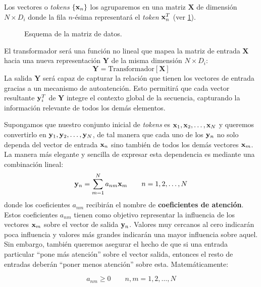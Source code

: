 Los vectores o \textit{tokens} $\{\mathbf{x}_n\}$ los agruparemos en una matriz $\mathbf{X}$ de dimensión $N \times D_i$ donde la fila $n$-ésima representará el  \textit{token} ${\mathbf{x}_n ^{T}}$ (ver \ref{fig:matriz_X}).

\begin{figure}[t]
    \vspace{0.8cm}
    \centering
    \MatrizX
    \caption{Esquema de la matriz de datos.}
    \label{fig:matriz_X}
    \vspace{0.8cm}
\end{figure}
El transformador será una función no lineal que mapea la matriz de 
entrada $\mathbf{X}$ hacia una nueva representación $\mathbf{Y}$ de la
misma dimensión $N \times D_i$:
\begin{equation}
    \mathbf{Y} = \text{Transformador}[\mathbf{X}]
\end{equation}
La salida $\mathbf{Y}$ será  capaz de capturar la relación que tienen los 
vectores de entrada gracias a un mecanismo de autoatención. 
Esto permitirá que cada vector resultante $\mathbf{y}_i^T$ de $\mathbf{Y}$ integre 
el contexto global de la secuencia, capturando la información relevante de 
todos los demás elementos.

Supongamos que nuestro conjunto inicial de \textit{tokens} es $\mathbf{x}_1,\mathbf{x}_2, \dots,\mathbf{x}_N$ y queremos convertirlo en  $\mathbf{y}_1,\mathbf{y}_2, \dots,\mathbf{y}_N$, de tal manera que cada uno de los $\mathbf{y}_n$ no solo dependa del vector de entrada $\mathbf{x}_n$ sino también de todos los demás vectores $\mathbf{x}_m$.
La manera más elegante y sencilla de expresar esta dependencia es mediante una combinación lineal:
\begin{equation}
    \mathbf{y}_n = \sum_{m=1}^{N} a_{nm}\mathbf{x}_m \qquad n = 1,2,\dots, N
    \label{combinacion_lineal}
\end{equation}
donde los coeficientes $a_{nm}$ recibirán el nombre de \textbf{coeficientes de atención}.
Estos coeficientes $a_{nm}$ tienen como objetivo representar la influencia de los vectores $\mathbf{x}_m$ sobre el vector de salida $\mathbf{y}_n$. Valores muy cercanos al cero indicarán poca influencia y valores más grandes indicarán una mayor influencia sobre aquel. Sin embargo, también queremos asegurar el hecho de que si una entrada particular ``pone más atención''  sobre el vector salida, entonces el resto de entradas deberán ``poner menos atención''  sobre esta. Matemáticamente:

\begin{equation}
    a_{nm} \geq 0 \qquad n,m = 1,2,\dots, N
    \label{atencion_positiva}
\end{equation}


